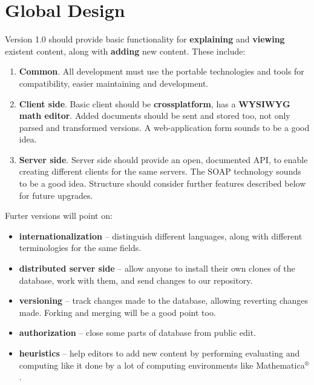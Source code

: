 \documentclass{article}
\begin{document}
\newpage

\section{Global Design}

Version 1.0 should provide basic functionality for {\bf explaining}
and {\bf viewing} existent content, along with {\bf adding} new
content. These include:

\begin{enumerate}
\item
{\bf Common}. All development must use the portable technologies and
tools for compatibility, easier maintaining and development.
\item
{\bf Client side}. Basic client should be {\bf crossplatform}, has a
{\bf WYSIWYG math editor}. Added documents should be sent and stored
too, not only parsed and transformed versions. A web-application
form sounds to be a good idea.
\item
{\bf Server side}. Server side should provide an open, documented
API, to enable creating different clients for the same servers. The
SOAP technology sounds to be a good idea. Structure should consider
further features described below for future upgrades.
\end{enumerate}

Furter versions will point on:
\begin{itemize}
\item {\bf internationalization} -- distinguish different
languages, along with different terminologies for the same fields.
\item {\bf distributed server side} -- allow anyone to install their own
clones of the database, work with them, and send changes to our
repository.
\item {\bf versioning} -- track changes made to the database,
allowing reverting changes made. Forking and merging will be a good
point too.
\item {\bf authorization} -- close some parts of database from public
edit.
\item {\bf heuristics} -- help editors to add new content by
performing evaluating and computing like it done by a lot of
computing environments like Mathematica$^\circledR$.

\end{itemize}
\end{document}
